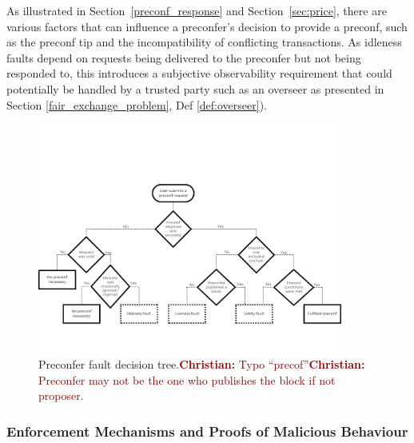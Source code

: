 \documentclass[a4paper]{article}
\theoremstyle{boldstyle}
\newcommand{\cm}[1]{\textcolor{blue}{\textbf{Conor:} #1}}
\newcommand{\dk}[1]{\textcolor{cyan}{\textbf{Demetris:} #1}}
\newcommand{\chm}[1]{\textcolor{Maroon}{\textbf{Christian:} #1}}
\begin{document}
        As illustrated in Section~\ref{preconf_response} and Section~\ref{sec:price}, there are various factors that can influence a preconfer's decision to provide a preconf, such as the preconf tip and the incompatibility of conflicting transactions. As idleness faults depend on requests being delivered to the preconfer but not being responded to, this introduces a subjective observability requirement that could potentially be handled by a trusted party such as an overseer as presented in Section \ref{fair_exchange_problem}, Def \ref{def:overseer}).
        

    \begin{figure}[htbp]
        \centering
        \includegraphics[width=0.9\textwidth]{figures/preconferFaultDecisionTree.png}
        \caption{Preconfer fault decision tree.\chm{Typo ``precof''}\chm{Preconfer may not be the one who publishes the block if not proposer.}}
        \label{preconfer fault tree}
    \end{figure}
    

\subsubsection{Enforcement Mechanisms and Proofs of Malicious Behaviour}
\label{sec:enforcement}
\end{document}
